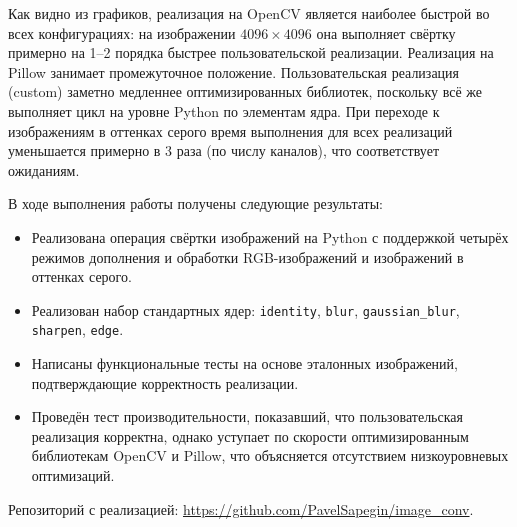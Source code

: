 \documentclass[a4paper]{article}
\begin{document}
Как видно из графиков, реализация на OpenCV является наиболее быстрой во всех конфигурациях: на изображении $4096\times4096$ она выполняет свёртку примерно на 1--2 порядка быстрее пользовательской реализации. Реализация на Pillow занимает промежуточное положение. Пользовательская реализация (custom) заметно медленнее оптимизированных библиотек, поскольку всё же выполняет цикл на уровне Python по элементам ядра. При переходе к изображениям в оттенках серого время выполнения для всех реализаций уменьшается примерно в 3 раза (по числу каналов), что соответствует ожиданиям.

В ходе выполнения работы получены следующие результаты:
\begin{itemize}
    \item Реализована операция свёртки изображений на Python с поддержкой четырёх режимов дополнения и обработки RGB-изображений и изображений в оттенках серого.
    \item Реализован набор стандартных ядер: \verb|identity|, \verb|blur|, \verb|gaussian_blur|, \verb|sharpen|, \verb|edge|.
    \item Написаны функциональные тесты на основе эталонных изображений, подтверждающие корректность реализации.
    \item Проведён тест производительности, показавший, что пользовательская реализация корректна, однако уступает по скорости оптимизированным библиотекам OpenCV и Pillow, что объясняется отсутствием низкоуровневых оптимизаций.
\end{itemize}

Репозиторий с реализацией: \url{https://github.com/PavelSapegin/image_conv}.
\end{document}
